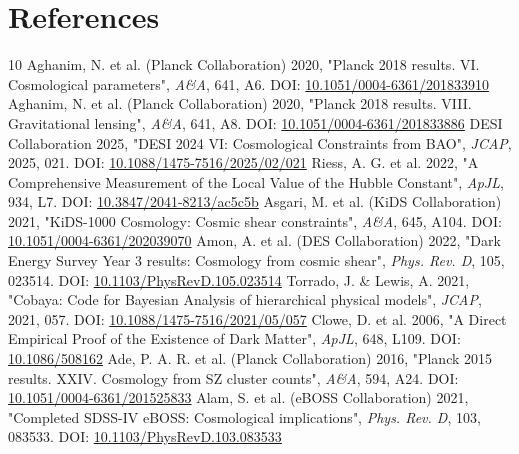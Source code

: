 \documentclass[11pt,a4paper]{article}
\begin{document}
\section{References}
\begin{thebibliography}{10}
 Aghanim, N. et al. (Planck Collaboration) 2020, "Planck 2018 results. VI. Cosmological parameters", \emph{A\&A}, 641, A6. DOI: \href{https://doi.org/10.1051/0004-6361/201833910}{10.1051/\allowbreak{}0004-6361/\allowbreak{}201833910}
 Aghanim, N. et al. (Planck Collaboration) 2020, "Planck 2018 results. VIII. Gravitational lensing", \emph{A\&A}, 641, A8. DOI: \href{https://doi.org/10.1051/0004-6361/201833886}{10.1051/\allowbreak{}0004-6361/\allowbreak{}201833886}
 DESI Collaboration 2025, "DESI 2024 VI: Cosmological Constraints from BAO", \emph{JCAP}, 2025, 021. DOI: \href{https://doi.org/10.1088/1475-7516/2025/02/021}{10.1088/\allowbreak{}1475-7516/\allowbreak{}2025/\allowbreak{}02/\allowbreak{}021}
 Riess, A. G. et al. 2022, "A Comprehensive Measurement of the Local Value of the Hubble Constant", \emph{ApJL}, 934, L7. DOI: \href{https://doi.org/10.3847/2041-8213/ac5c5b}{10.3847/\allowbreak{}2041-8213/\allowbreak{}ac5c5b}
 Asgari, M. et al. (KiDS Collaboration) 2021, "KiDS-1000 Cosmology: Cosmic shear constraints", \emph{A\&A}, 645, A104. DOI: \href{https://doi.org/10.1051/0004-6361/202039070}{10.1051/\allowbreak{}0004-6361/\allowbreak{}202039070}
 Amon, A. et al. (DES Collaboration) 2022, "Dark Energy Survey Year 3 results: Cosmology from cosmic shear", \emph{Phys. Rev. D}, 105, 023514. DOI: \href{https://doi.org/10.1103/PhysRevD.105.023514}{10.1103/\allowbreak{}PhysRevD.105.023514}
 Torrado, J. \& Lewis, A. 2021, "Cobaya: Code for Bayesian Analysis of hierarchical physical models", \emph{JCAP}, 2021, 057. DOI: \href{https://doi.org/10.1088/1475-7516/2021/05/057}{10.1088/\allowbreak{}1475-7516/\allowbreak{}2021/\allowbreak{}05/\allowbreak{}057}
 Clowe, D. et al. 2006, "A Direct Empirical Proof of the Existence of Dark Matter", \emph{ApJL}, 648, L109. DOI: \href{https://doi.org/10.1086/508162}{10.1086/\allowbreak{}508162}
 Ade, P. A. R. et al. (Planck Collaboration) 2016, "Planck 2015 results. XXIV. Cosmology from SZ cluster counts", \emph{A\&A}, 594, A24. DOI: \href{https://doi.org/10.1051/0004-6361/201525833}{10.1051/\allowbreak{}0004-6361/\allowbreak{}201525833}
 Alam, S. et al. (eBOSS Collaboration) 2021, "Completed SDSS-IV eBOSS: Cosmological implications", \emph{Phys. Rev. D}, 103, 083533. DOI: \href{https://doi.org/10.1103/PhysRevD.103.083533}{10.1103/\allowbreak{}PhysRevD.103.083533}
\end{thebibliography}
\end{document}
